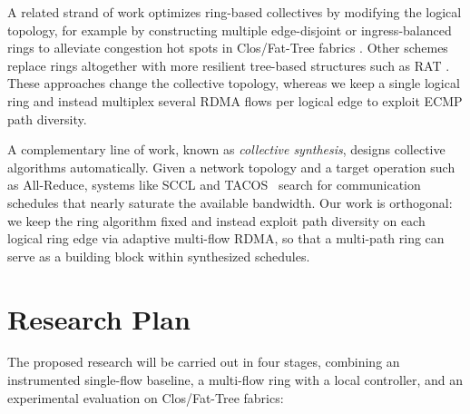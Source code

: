 \documentclass[12pt]{article}
\begin{document}
A related strand of work optimizes ring-based collectives by modifying the logical topology, for example by constructing multiple edge-disjoint or ingress-balanced rings to alleviate congestion hot spots in Clos/Fat-Tree fabrics \cite{zong2025ibing}. Other schemes replace rings altogether with more resilient tree-based structures such as RAT \cite{wan2020rat}. These approaches change the collective topology, whereas we keep a single logical ring and instead multiplex several RDMA flows per logical edge to exploit ECMP path diversity.

A complementary line of work, known as \emph{collective synthesis}, designs collective algorithms automatically. Given a network topology and a target operation such as All-Reduce, systems like SCCL and TACOS~\cite{cai2021sccl,won2024tacos} search for communication schedules that nearly saturate the available bandwidth. Our work is orthogonal: we keep the ring algorithm fixed and instead exploit path diversity on each logical ring edge via adaptive multi-flow RDMA, so that a multi-path ring can serve as a building block within synthesized schedules.



\section{Research Plan}

The proposed research will be carried out in four stages, combining an instrumented single-flow baseline, a multi-flow ring with a local controller, and an experimental evaluation on Clos/Fat-Tree fabrics:
\end{document}
